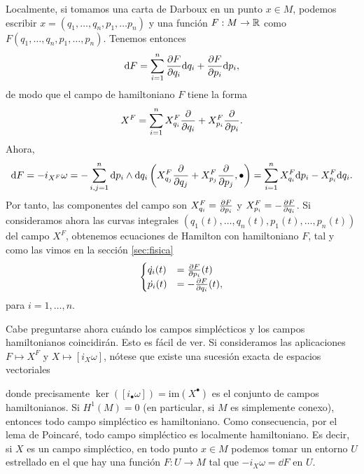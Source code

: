 Localmente, si tomamos una carta de Darboux en un punto $x\in M$, podemos escribir $x=(q_1,\dots,q_n,p_1,\dots p_n)$ y una función $F:M\rightarrow \mathbb{R}$ como $F(q_1,\dots,q_n,p_1,\dots,p_n)$. Tenemos entonces
\begin{equation*}
  \mathrm{d} F=\sum_{i=1}^n \frac{\partial F}{\partial q_i}\mathrm{d} q_i + \frac{\partial F}{\partial p_i} \mathrm{d} p_i,
\end{equation*}
de modo que el campo de hamiltoniano $F$ tiene la forma
\begin{equation*}
    X^F = \sum_{i=1}^n X_{q_i}^F \frac{\partial}{\partial q_i} + X_{p_i}^F \frac{\partial}{\partial p_i}.
\end{equation*}
  Ahora, 
  \begin{equation*}
    \mathrm{d} F =- i_{X^F}\omega=- \sum_{i,j=1}^n \mathrm{d} p_i \wedge \mathrm{d} q_i \left(X_{q_j}^F \frac{\partial}{\partial q_j} + X^F_{p_j} \frac{\partial}{\partial p_j},\bullet\right)  = \sum_{i=1}^n X_{q_i}^F \mathrm{d} p_i -X_{p_i}^F \mathrm{d} q_i.
  \end{equation*}
  Por tanto, las componentes del campo son $X^F_{q_i}=\frac{\partial F}{\partial p_i}$ y $X^F_{p_i}=-\frac{\partial F}{\partial q_i}$. Si consideramos ahora las curvas integrales $(q_1(t),\dots,q_n(t),p_1(t),\dots,p_n(t))$ del campo $X^F$, obtenemos ecuaciones de Hamilton con hamiltoniano $F$, tal y como las vimos en la sección \ref{sec:fisica}
  \begin{equation*}
  \begin{cases}
     \dot{q_i}(t) & = \frac{\partial F}{\partial p_i}(t) \\
     \dot{p_i}(t) & = -\frac{\partial F}{\partial q_i} (t),
  \end{cases}
\end{equation*}
  para $i=1,\dots,n$.

  Cabe preguntarse ahora cuándo los campos simplécticos y los campos hamiltonianos coincidirán. Esto es fácil de ver. Si consideramos las aplicaciones $F\mapsto X^F$ y $X\mapsto [i_X\omega]$, nótese que existe una sucesión exacta de espacios vectoriales
  \begin{center}
  \end{center}
  donde precisamente $\ker([i_{\bullet}\omega])=\mathrm{im}(X^{\bullet})$ es el conjunto de campos hamiltonianos.
  Si $H^1(M)=0$ (en particular, si $M$ es simplemente conexo), entonces todo campo simpléctico es hamiltoniano. Como consecuencia, por el lema de Poincaré, todo campo simpléctico es localmente hamiltoniano. Es decir, si $X$ es un campo simpléctico, en todo punto $x\in M$ podemos tomar un entorno $U$ estrellado en el que hay una función $F:U\rightarrow M$ tal que $-i_X\omega=\dd F$ en $U$.

